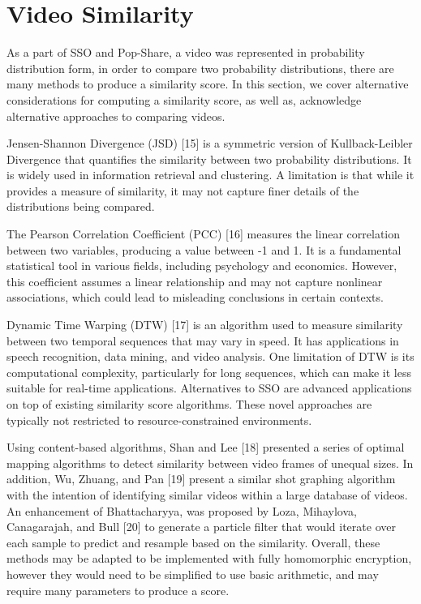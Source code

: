 \section{Video Similarity}

As a part of SSO and Pop-Share, a video was represented in probability distribution form, in order to compare two probability distributions, there are many methods to produce a similarity score. In this section, we cover alternative considerations for computing a similarity score, as well as, acknowledge alternative approaches to comparing videos.

Jensen-Shannon Divergence (JSD) [15] is a symmetric version of Kullback-Leibler Divergence that quantifies the similarity between two probability distributions. It is widely used in information retrieval and clustering. A limitation is that while it provides a measure of similarity, it may not capture finer details of the distributions being compared. 



The Pearson Correlation Coefficient (PCC) [16] measures the linear correlation between two variables, producing a value between -1 and 1. It is a fundamental statistical tool in various fields, including psychology and economics. However, this coefficient assumes a linear relationship and may not capture nonlinear associations, which could lead to misleading conclusions in certain contexts. 



Dynamic Time Warping (DTW) [17] is an algorithm used to measure similarity between two temporal sequences that may vary in speed. It has applications in speech recognition, data mining, and video analysis. One limitation of DTW is its computational complexity, particularly for long sequences, which can make it less suitable for real-time applications. Alternatives to SSO are advanced applications on top of existing similarity score algorithms. These novel approaches are typically not restricted to resource-constrained environments.




Using content-based algorithms, Shan and Lee [18] presented a series of optimal mapping algorithms to detect similarity between video frames of unequal sizes. In addition, Wu, Zhuang, and Pan [19] present a similar shot graphing algorithm with the intention of identifying similar videos within a large database of videos. An enhancement of Bhattacharyya, was proposed by Loza, Mihaylova, Canagarajah, and Bull [20] to generate a particle filter that would iterate over each sample to predict and resample based on the similarity. Overall, these methods may be adapted to be implemented with fully homomorphic encryption, however they would need to be simplified to use basic arithmetic, and may require many parameters to produce a score.